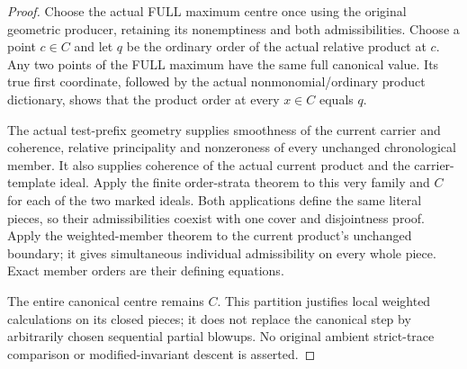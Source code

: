 \begin{proof}
Choose the actual FULL maximum centre once using the original geometric
producer, retaining its nonemptiness and both admissibilities. Choose a
point $c\in C$ and let $q$ be the ordinary order of the actual relative
product at $c$. Any two points of the FULL maximum have the same full
canonical value. Its true first coordinate, followed by the actual
nonmonomial/ordinary product dictionary, shows that the product order
at every $x\in C$ equals $q$.

The actual test-prefix geometry supplies smoothness of the current
carrier and coherence, relative principality and nonzeroness of every
unchanged chronological member. It also supplies coherence of the
actual current product and the carrier-template ideal. Apply the finite
order-strata theorem to this very family and $C$ for each of the two
marked ideals. Both applications define the same literal pieces, so
their admissibilities coexist with one cover and disjointness proof.
Apply the weighted-member theorem to the current product's unchanged
boundary; it gives simultaneous individual admissibility on every
whole piece. Exact member orders are their defining equations.

The entire canonical centre remains $C$. This partition justifies local
weighted calculations on its closed pieces; it does not replace the
canonical step by arbitrarily chosen sequential partial blowups. No
original ambient strict-trace comparison or modified-invariant descent
is asserted.
\end{proof}
